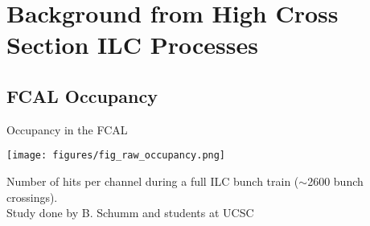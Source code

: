 \documentclass[xcolor={dvipsnames}]{beamer}
\begin{document}
\section{Background from High Cross Section ILC Processes}
\subsection{FCAL Occupancy}
\begin{frame}{Occupancy in the FCAL}
  \begin{center}
     \texttt{[image: figures/fig\_raw\_occupancy.png]}
  \end{center}
  Number of hits per channel during a full ILC bunch train ($\sim$2600 bunch crossings).\\
  {\hfill \tiny Study done by B. Schumm and students at UCSC}
\end{frame}

\end{document}
